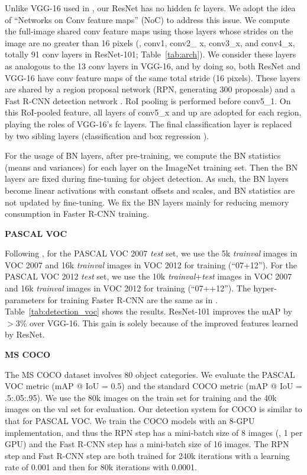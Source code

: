 \documentclass[10pt,twocolumn,letterpaper]{article}
\begin{document}
Unlike VGG-16 used in \cite{Ren2015}, our ResNet has no hidden fc layers. We adopt the idea of ``Networks on Conv feature maps'' (NoC) \cite{Ren2015a} to address this issue.
We compute the full-image shared conv feature maps using those layers whose strides on the image are no greater than 16 pixels (\ie, conv1, conv2\_ x, conv3\_x, and conv4\_x, totally 91 conv layers in ResNet-101; Table~\ref{tab:arch}). We consider these layers as analogous to the 13 conv layers in VGG-16, and by doing so, both ResNet and VGG-16 have conv feature maps of the same total stride (16 pixels).
These layers are shared by a region proposal network (RPN, generating 300 proposals) \cite{Ren2015} and a Fast R-CNN detection network \cite{Girshick2015}.
RoI pooling \cite{Girshick2015} is performed before conv5\_1. On this RoI-pooled feature, all layers of conv5\_x and up are adopted for each region, playing the roles of VGG-16's fc layers.
The final classification layer is replaced by two sibling layers (classification and box regression \cite{Girshick2015}).

For the usage of BN layers, after pre-training, we compute the BN statistics (means and variances) for each layer on the ImageNet training set. Then the BN layers are fixed during fine-tuning for object detection. As such, the BN layers become linear activations with constant offsets and scales, and BN statistics are not updated by fine-tuning. We fix the BN layers mainly for reducing memory consumption in Faster R-CNN training.


\vspace{.5em}
\noindent\textbf{PASCAL VOC}

Following \cite{Girshick2015,Ren2015}, for the PASCAL VOC 2007 \emph{test} set, we use the 5k \emph{trainval} images in VOC 2007 and 16k \emph{trainval} images in VOC 2012 for training (``07+12''). For the PASCAL VOC 2012 \emph{test} set, we use the 10k \emph{trainval}+\emph{test} images in VOC 2007 and 16k \emph{trainval} images in VOC 2012 for training (``07++12''). The hyper-parameters for training Faster R-CNN are the same as in \cite{Ren2015}.
Table~\ref{tab:detection_voc} shows the results. ResNet-101 improves the mAP by $>$3\% over VGG-16. This gain is solely because of the improved features learned by ResNet.



\vspace{.5em}
\noindent\textbf{MS COCO}

The MS COCO dataset \cite{Lin2014} involves 80 object categories. We evaluate the PASCAL VOC metric (mAP @ IoU = 0.5) and the standard COCO metric (mAP @ IoU = .5:.05:.95). We use the 80k images on the train set for training and the 40k images on the val set for evaluation.
Our detection system for COCO is similar to that for PASCAL VOC.
We train the COCO models with an 8-GPU implementation, and thus the RPN step has a mini-batch size of 8 images (\ie, 1 per GPU) and the Fast R-CNN step has a mini-batch size of 16 images. The RPN step and Fast R-CNN step are both trained for 240k iterations with a learning rate of 0.001 and then for 80k iterations with 0.0001.
\end{document}
